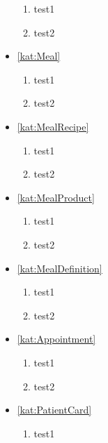 \begin{itemize}[label={\textbf{Reguły dla}}, wide, labelwidth=!, labelindent=0pt]
    \begin{enumerate}[label={\textbf{REG/\protect\threedigits{\arabic{enumi}}}}, wide, labelwidth=!, resume]
        \item test1
        \item test2
    \end{enumerate}
    \item\ref{kat:Meal}
    \begin{enumerate}[label={\textbf{REG/\protect\threedigits{\arabic{enumi}}}}, wide, labelwidth=!, resume]
        \item test1
        \item test2
    \end{enumerate}
    \item\ref{kat:MealRecipe}
    \begin{enumerate}[label={\textbf{REG/\protect\threedigits{\arabic{enumi}}}}, wide, labelwidth=!, resume]
        \item test1
        \item test2
    \end{enumerate}
    \item\ref{kat:MealProduct}
    \begin{enumerate}[label={\textbf{REG/\protect\threedigits{\arabic{enumi}}}}, wide, labelwidth=!, resume]
        \item test1
        \item test2
    \end{enumerate}
    \item\ref{kat:MealDefinition}
    \begin{enumerate}[label={\textbf{REG/\protect\threedigits{\arabic{enumi}}}}, wide, labelwidth=!, resume]
        \item test1
        \item test2
    \end{enumerate}
    \item\ref{kat:Appointment}
    \begin{enumerate}[label={\textbf{REG/\protect\threedigits{\arabic{enumi}}}}, wide, labelwidth=!, resume]
        \item test1
        \item test2
    \end{enumerate}
    \item\ref{kat:PatientCard}
    \begin{enumerate}[label={\textbf{REG/\protect\threedigits{\arabic{enumi}}}}, wide, labelwidth=!, resume]
        \item test1

\end{enumerate}
\end{itemize}
